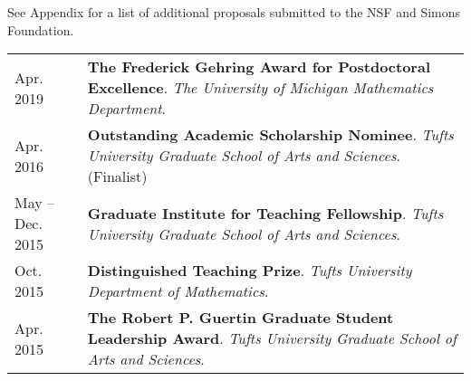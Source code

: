     \vspace{-1em}
    

        \bigskip

See Appendix for a list of additional proposals submitted to the NSF and
Simons Foundation.

    
    \medskip


    \medskip
    
    \begin{center}
    {
    \renewcommand{\arraystretch}{1.5}
    \begin{longtable}{p{}  p{}}
     Apr.  2019 & \textbf{The Frederick Gehring Award for Postdoctoral Excellence}. \textit{The University of Michigan Mathematics Department}.  \\ 
 Apr.  2016 & \textbf{Outstanding Academic Scholarship Nominee}. \textit{Tufts University Graduate School of Arts and Sciences}. (Finalist) \\ 
 May  --  Dec.  2015 & \textbf{Graduate Institute for Teaching Fellowship}. \textit{Tufts University Graduate School of Arts and Sciences}.  \\ 
 Oct.  2015 & \textbf{Distinguished Teaching Prize}. \textit{Tufts University Department of Mathematics}.  \\ 
 Apr.  2015 & \textbf{The Robert P. Guertin Graduate Student Leadership Award}. \textit{Tufts University Graduate School of Arts and Sciences}.  
    \end{longtable}
    } 
    \end{center}

    \vspace{-1em}
    